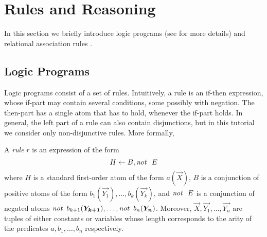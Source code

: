 \section{Rules and Reasoning}
\label{sec:reasoning}
In this section we briefly introduce logic programs (see \cite{DBLP:conf/rweb/EiterIK09} for more details) and relational association rules \cite{DBLP:conf/esf/GoethalsB02}.

\subsection{Logic Programs} Logic programs consist of a set of rules. Intuitively, a rule is an if-then expression, whose  if-part may contain several conditions, some possibly with
negation. The then-part has a single atom that has to hold, whenever the if-part holds. In general, the left part of a rule can also contain disjunctions, but in this tutorial we consider only non-disjunctive rules. More formally,




\begin{definition} A \emph{rule} $r$ is an expression of the form
\begin{equation}
H\leftarrow B, \mathit{not}~ \ E
\end{equation}
where $H$ is a standard first-order atom of the form $a(\vec{X})$, $B$ is a conjunction of positive atoms of the form $b_1(\vec{Y_1}),\dotsc,b_k(\vec{Y_k})$, and $\mathit{not}~ \ E$ %
 is a conjunction of negated atoms $\naf\, b_{k+1}(\vec{Y_{k+1}}),\dotsc,\naf\, b_n(\vec{Y_{n}})$. Moreover,  $\vec{X},\vec{Y_1},\ldots,\vec{Y_{n}}$ are tuples of either constants or variables whose length corresponds to the arity of the predicates $a,b_1,\ldots,b_n$ respectively.
\end{definition}

